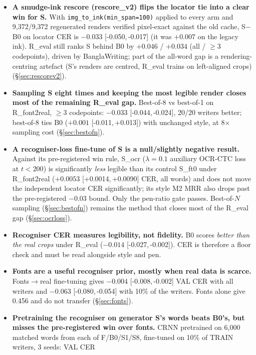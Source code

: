 \documentclass[10.5pt,a4paper]{article}
\newcommand{\ci}[2]{{\footnotesize[#1,\,#2]}}
\begin{document}
\begin{itemize}
  is a short-word \texttt{img\_to\_ink} artefact; the $\ge$3-codepoint gap remains significant (\S\ref{sec:rescore}).
\item \textbf{A smudge-ink rescore (rescore\_v2) flips the locator tie into a clear win for S.} With
  \texttt{img\_to\_ink(min\_span=100)} applied to every arm and 9,372/9,372 regenerated renders verified pixel-exact against
  the old cache, S$-$B0 on locator CER is $-0.033$ \ci{-0.050}{-0.017} (it was $+0.007$ on the legacy ink). R\_eval still
  ranks S behind B0 by $+0.046$ / $+0.034$ (all / $\ge$3 codepoints), driven by BanglaWriting; part of the all-word gap is a
  rendering-centring artefact (S's renders are centred, R\_eval trains on left-aligned crops) (\S\ref{sec:rescorev2}).
\item \textbf{Sampling S eight times and keeping the most legible render closes most of the remaining R\_eval gap.}
  Best-of-8 vs best-of-1 on R\_font2real, $\ge$3 codepoints: $-0.033$ \ci{-0.044}{-0.024}, 20/20 writers better; best-of-8
  ties B0 ($+0.001$ \ci{-0.011}{+0.013}) with unchanged style, at 8$\times$ sampling cost (\S\ref{sec:bestofn}).
\item \textbf{A recogniser-loss fine-tune of S is a null/slightly negative result.} Against its pre-registered win rule,
  S\_ocr ($\lambda=0.1$ auxiliary OCR-CTC loss at $t<200$) is significantly \emph{less} legible than its control S\_ft0
  under R\_font2real ($+0.0053$ \ci{+0.0014}{+0.0090} CER, all words) and does not move the independent locator CER
  significantly; its style M2 MRR also drops past the pre-registered $-0.03$ bound. Only the pen-ratio gate passes.
  Best-of-$N$ sampling (\S\ref{sec:bestofn}) remains the method that closes most of the R\_eval gap (\S\ref{sec:ocrloss}).
\item \textbf{Recogniser CER measures legibility, not fidelity.} B0 scores \emph{better than the real crops} under R\_eval
  ($-0.014$ \ci{-0.027}{-0.002}). CER is therefore a floor check and must be read alongside style and pen.
\item \textbf{Fonts are a useful recogniser prior, mostly when real data is scarce.} Fonts$\to$real fine-tuning gives
  $-0.004$ \ci{-0.008}{-0.002} VAL CER with all writers and $-0.063$ \ci{-0.080}{-0.054} with 10\% of the writers. Fonts
  alone give 0.456 and do not transfer (\S\ref{sec:fonts}).
\item \textbf{Pretraining the recogniser on generator S's words beats B0's, but misses the pre-registered win over fonts.}
  CRNN pretrained on 6,000 matched words from each of F/B0/S1/S8, fine-tuned on 10\% of TRAIN writers, 3 seeds: VAL CER

\end{itemize}
\end{document}
